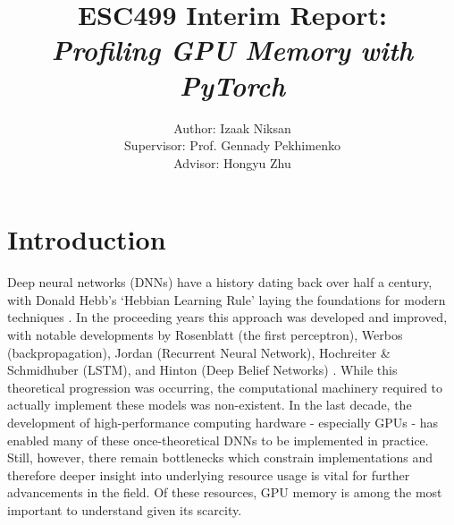 \documentclass[12pt,letterpaper]{article}
\begin{document}
\title{\textbf{ESC499 Interim Report:\\ \textit{Profiling GPU Memory with PyTorch}}}

\author{Author: Izaak Niksan\\
Supervisor: Prof. Gennady Pekhimenko\\
Advisor: Hongyu Zhu
}

\maketitle
\newpage
\section{Introduction}
Deep neural networks (DNNs) have a history dating back over half a century, with Donald Hebb's \enquote*{Hebbian Learning Rule} laying the foundations for modern techniques \cite{dnn_history}. In the proceeding years this approach was developed and improved, with notable developments by Rosenblatt (the first perceptron), Werbos (backpropagation), Jordan (Recurrent Neural Network), Hochreiter \& Schmidhuber (LSTM), and Hinton (Deep Belief Networks) \cite{dnn_history}. While this theoretical progression was occurring, the computational machinery required to actually implement these models was non-existent. In the last decade, the development of high-performance computing hardware - especially GPUs - has enabled many of these once-theoretical DNNs to be implemented in practice. Still, however, there remain bottlenecks which constrain implementations and therefore deeper insight into underlying resource usage is vital for further advancements in the field. Of these resources, GPU memory is among the most important to understand given its scarcity. \par 
\end{document}
